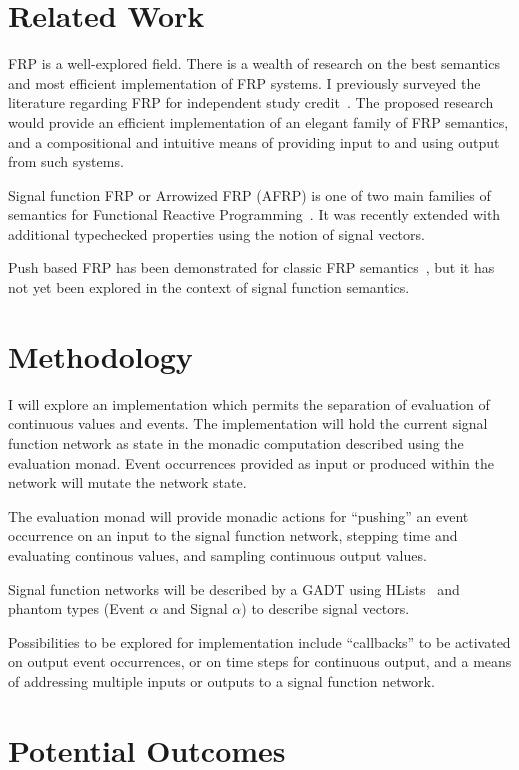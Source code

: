\documentclass[11pt]{artikel3}
\begin{document}
\section{Related Work}

FRP is a well-explored field. There is a wealth of research on the best semantics and most efficient implementation of FRP systems. I previously surveyed the literature regarding FRP for independent study credit~\cite{Amsden2011}. The proposed research would provide an efficient implementation of an elegant family of FRP semantics, and a compositional and intuitive means of providing input to and using output from such systems.

Signal function FRP or Arrowized FRP (AFRP) is one of two main families of semantics for Functional Reactive 
Programming~\cite{Nilsson2002}. It was recently extended with additional typechecked properties using the notion of signal 
vectors. 

Push based FRP has been demonstrated for classic FRP semantics~\cite{Elliott2009}, but it has not yet been explored in the context of signal function semantics.

\section{Methodology}
\label{sec:methodology}

I will explore an implementation which permits the separation of evaluation of continuous values and events. The implementation will hold the current signal function network as state in the monadic computation described using the evaluation monad. Event occurrences provided as input or produced within the network will mutate the network state. 

The evaluation monad will provide monadic actions for ``pushing'' an event occurrence on an input to the signal function network, stepping time and evaluating continous values, and sampling continuous output values.

Signal function networks will be described by a GADT using HLists~\cite{Kiselyov2004} and phantom types (Event $\alpha$ and Signal $\alpha$) to describe signal vectors. 

Possibilities to be explored for implementation include ``callbacks'' to be activated on output event occurrences, or on time
steps for continuous output, and a means of addressing multiple inputs or outputs to a signal function network.

\section{Potential Outcomes}
\end{document}
